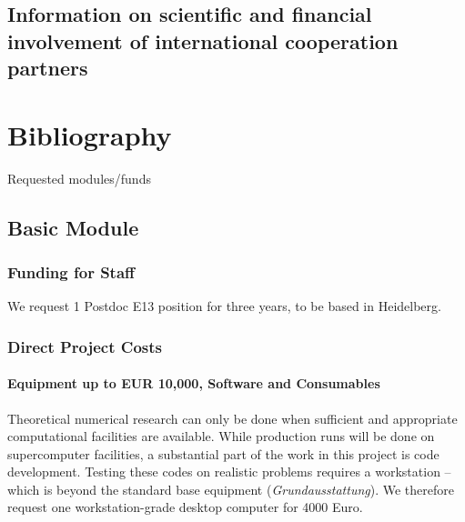 \documentclass[10pt,fleqn,twoside]{article}
\begin{document}
\subsection{Information on scientific and financial involvement of international cooperation partners}




\section{Bibliography}

\begingroup
\renewcommand{\section}[2]{}%


\endgroup


\section{Requested modules/funds}
\renewcommand{\leftmark}{\sc Requested modules/funds}

\subsection{Basic Module}

\subsubsection{Funding for Staff}

We request 1 Postdoc E13 position for three years, to be based in Heidelberg.

\subsubsection{Direct Project Costs}

\paragraph{Equipment up to EUR 10,000, Software and Consumables}
Theoretical numerical research can only be done when sufficient and
appropriate computational facilities are available. While production runs
will be done on supercomputer facilities, a substantial part of the work in
this project is code development. Testing these codes on realistic problems
requires a workstation -- which is beyond the standard base equipment
(\textit{Grundausstattung}). We therefore request one workstation-grade
desktop computer for 4000 Euro.
\end{document}
